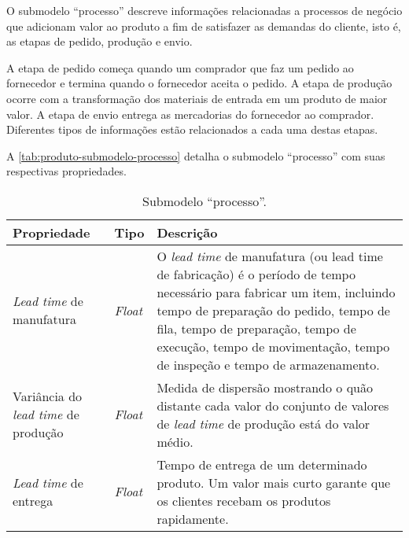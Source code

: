 O submodelo ``processo'' descreve informações relacionadas a processos de negócio que adicionam valor ao produto a fim de satisfazer as demandas do cliente, isto é, as etapas de pedido, produção e envio.

A etapa de pedido começa quando um comprador que faz um pedido ao fornecedor e termina quando o fornecedor aceita o pedido. A etapa de produção ocorre com a transformação dos materiais de entrada em um produto de maior valor. A etapa de envio entrega as mercadorias do fornecedor ao comprador. Diferentes tipos de informações estão relacionados a cada uma destas etapas.

A \autoref{tab:produto-submodelo-processo} detalha o submodelo ``processo'' com suas respectivas propriedades.

\begin{table}[htb]
	\centering
	\caption{Submodelo ``processo''.}
	\begin{tabular}{p{3.5cm}p{1.5cm}p{9cm}}
		\hline
		\textbf{Propriedade}
		 & \textbf{Tipo}
		 & \textbf{Descrição}                                                                                                                                                                                                                                                                        \\

		\hline
		\textit{Lead time} de manufatura
		 & \textit{Float}
		 & O \textit{lead time} de manufatura (ou lead time de fabricação) é o período de tempo necessário para fabricar um item, incluindo tempo de preparação do pedido, tempo de fila, tempo de preparação, tempo de execução, tempo de movimentação, tempo de inspeção e tempo de armazenamento. \\

		\hline
		Variância do \textit{lead time} de produção
		 & \textit{Float}
		 & Medida de dispersão mostrando o quão distante cada valor do conjunto de valores de \textit{lead time} de produção está do valor médio.                                                                                                                                                    \\

		\hline
		\textit{Lead time} de entrega
		 & \textit{Float}
		 & Tempo de entrega de um determinado produto. Um valor mais curto garante que os clientes recebam os produtos rapidamente.                                                                                                                                                                  \\


\end{tabular}
\end{table}
